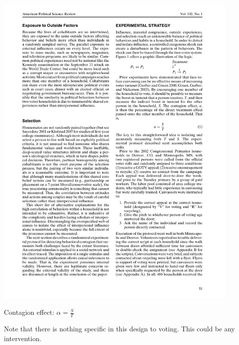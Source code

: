 \documentclass[aspectratio=169]{beamer}
\begin{document}
\begin{frame}

\begin{center}
\includegraphics[width=0.9\textwidth]{figures/nickerson_schema}
\end{center}

Contagion effect: $\alpha = \frac{S}{T}$

\vfill
Note that there is nothing specific in this design to voting.  This could be any intervention.

\end{frame}
\end{document}
